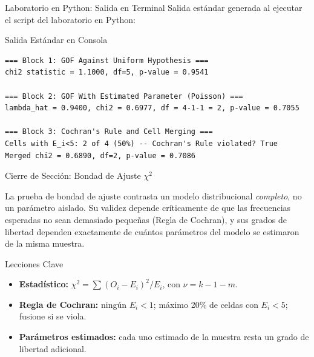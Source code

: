 \documentclass[10pt, aspectratio=169]{beamer}
\begin{document}
\begin{frame}[fragile]{Laboratorio en Python: Salida en Terminal}
  \scriptsize
  Salida estándar generada al ejecutar el script del laboratorio en Python:
  \vspace{0.02cm}
  \begin{block}{Salida Estándar en Consola}
    \fontsize{4pt}{5pt}\selectfont
    \begin{verbatim}
=== Block 1: GOF Against Uniform Hypothesis ===
chi2 statistic = 1.1000, df=5, p-value = 0.9541

=== Block 2: GOF With Estimated Parameter (Poisson) ===
lambda_hat = 0.9400, chi2 = 0.6977, df = 4-1-1 = 2, p-value = 0.7055

=== Block 3: Cochran's Rule and Cell Merging ===
Cells with E_i<5: 2 of 4 (50%) -- Cochran's Rule violated? True
Merged chi2 = 0.6890, df=2, p-value = 0.7086
    \end{verbatim}
  \end{block}
\end{frame}

\begin{frame}{Cierre de Sección: Bondad de Ajuste $\chi^2$}
  \begin{reflexion}
    La prueba de bondad de ajuste contrasta un modelo distribucional \emph{completo}, no un parámetro aislado. Su validez depende críticamente de que las frecuencias esperadas no sean demasiado pequeñas (Regla de Cochran), y sus grados de libertad dependen exactamente de cuántos parámetros del modelo se estimaron de la misma muestra.
  \end{reflexion}

  \vspace{0.2cm}
  \pause
  \begin{block}{Lecciones Clave}
    \begin{itemize}\itemsep=0.08cm
      \item \textbf{Estadístico:} $\chi^2=\sum(O_i-E_i)^2/E_i$, con $\nu=k-1-m$.
      \item \textbf{Regla de Cochran:} ningún $E_i<1$; máximo 20\% de celdas con $E_i<5$; fusione si se viola.
      \item \textbf{Parámetros estimados:} cada uno estimado de la muestra resta un grado de libertad adicional.
    \end{itemize}
  \end{block}
\end{frame}
\end{document}
